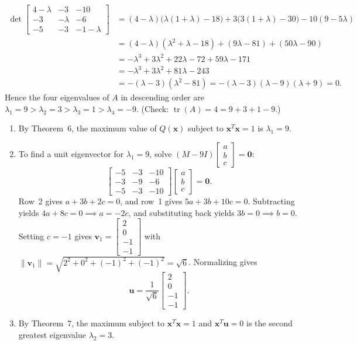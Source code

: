 \documentclass[11pt, letterpaper]{article}
\theoremstyle{definition}
\theoremstyle{remark}
\begin{document}
\begin{align*}
\det\begin{bmatrix} 4-\lambda & -3 & -10 \\ -3 & -\lambda & -6 \\ -5 & -3 & -1-\lambda \end{bmatrix} &= (4-\lambda)\bigl(\lambda(1+\lambda) - 18\bigr) + 3\bigl(3(1+\lambda) - 30\bigr) - 10(9 - 5\lambda) \\
&= (4-\lambda)(\lambda^2 + \lambda - 18) + (9\lambda - 81) + (50\lambda - 90) \\
&= -\lambda^3 + 3\lambda^2 + 22\lambda - 72 + 59\lambda - 171 \\
&= -\lambda^3 + 3\lambda^2 + 81\lambda - 243 \\
&= -(\lambda - 3)(\lambda^2 - 81) = -(\lambda - 3)(\lambda - 9)(\lambda + 9) = 0.
\end{align*}
Hence the four eigenvalues of $A$ in descending order are $\lambda_1 = 9 > \lambda_2 = 3 > \lambda_3 = 1 > \lambda_4 = -9$. (Check: $\operatorname{tr}(A) = 4 = 9 + 3 + 1 - 9$.)

\begin{enumerate}[label=(\alph*)]
    \item By Theorem~6, the maximum value of $Q(\mathbf{x})$ subject to $\mathbf{x}^T \mathbf{x} = 1$ is $\lambda_1 = 9$.
    \item To find a unit eigenvector for $\lambda_1 = 9$, solve $(M - 9I)\begin{bmatrix} a \\ b \\ c \end{bmatrix} = \mathbf{0}$:
    \[
    \begin{bmatrix} -5 & -3 & -10 \\ -3 & -9 & -6 \\ -5 & -3 & -10 \end{bmatrix} \begin{bmatrix} a \\ b \\ c \end{bmatrix} = \mathbf{0}.
    \]
    Row~2 gives $a + 3b + 2c = 0$, and row~1 gives $5a + 3b + 10c = 0$. Subtracting yields $4a + 8c = 0 \implies a = -2c$, and substituting back yields $3b = 0 \implies b = 0$. Setting $c = -1$ gives $\mathbf{v}_1 = \begin{bmatrix} 2 \\ 0 \\ -1 \\ -1 \end{bmatrix}$ with $\|\mathbf{v}_1\| = \sqrt{2^2 + 0^2 + (-1)^2 + (-1)^2} = \sqrt{6}$. Normalizing gives
    \[
    \mathbf{u} = \frac{1}{\sqrt{6}}\begin{bmatrix} 2 \\ 0 \\ -1 \\ -1 \end{bmatrix}.
    \]
    \item By Theorem~7, the maximum subject to $\mathbf{x}^T \mathbf{x} = 1$ and $\mathbf{x}^T \mathbf{u} = 0$ is the second greatest eigenvalue $\lambda_2 = 3$.
\end{enumerate}
\end{document}
